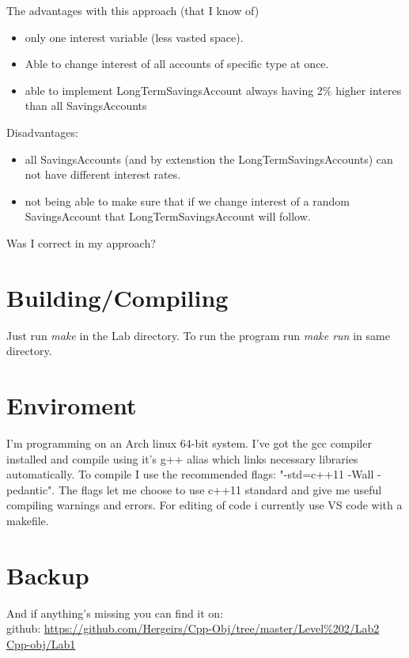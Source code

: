 \documentclass[11pt]{article}
\begin{document}
The advantages with this approach (that I know of)
\begin{itemize}
	\item only one interest variable (less vasted space).
	\item Able to change interest of all accounts of specific type at once.
	\item able to implement LongTermSavingsAccount always having 2\% higher interes than all SavingsAccounts 
\end{itemize}
Disadvantages:
\begin{itemize}
	\item all SavingsAccounts (and by extenstion the LongTermSavingsAccounts) can not have different interest rates.
	\item not being able to make sure that if we change interest of a random SavingsAccount that LongTermSavingsAccount will follow.
\end{itemize}

Was I correct in my approach?

\section{Building/Compiling}
Just run \emph{make} in the Lab directory.
To run the program run \emph{make run} in same directory.

\section{Enviroment}
I'm programming on an Arch linux 64-bit system. I've got the gcc compiler installed and compile using it's g++ alias which links necessary libraries automatically. To compile I use the recommended flags: "-std=c++11 -Wall -pedantic". The flags let me choose to use c++11 standard and give me useful compiling warnings and errors. 
For editing of code i currently use VS code with a makefile.

\section{Backup}
And if anything's missing you can find it on: \\
github: \url{https://github.com/Hergeirs/Cpp-Obj/tree/master/Level%202/Lab2} \\
\href{https://github.com/Hergeirs/Cpp-Obj/tree/master/Level%202/Lab2}{Cpp-obj/Lab1}



\flushright{\today}
\end{document}
